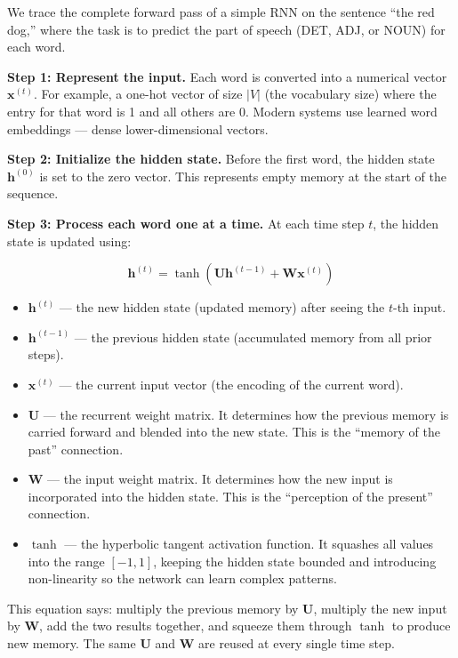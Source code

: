 \documentclass[12pt,a4paper]{article}
\begin{document}
We trace the complete forward pass of a simple RNN on the sentence ``the red dog,''
where the task is to predict the part of speech (DET, ADJ, or NOUN) for each word.

\medskip
\noindent\textbf{Step 1: Represent the input.}
Each word is converted into a numerical vector $\mathbf{x}^{(t)}$. For example, a
one-hot vector of size $|V|$ (the vocabulary size) where the entry for that word is 1
and all others are 0. Modern systems use learned word embeddings --- dense
lower-dimensional vectors.

\medskip
\noindent\textbf{Step 2: Initialize the hidden state.}
Before the first word, the hidden state $\mathbf{h}^{(0)}$ is set to the zero vector.
This represents empty memory at the start of the sequence.

\medskip
\noindent\textbf{Step 3: Process each word one at a time.}
At each time step $t$, the hidden state is updated using:

\[
\mathbf{h}^{(t)} = \tanh\!\left(\mathbf{U}\mathbf{h}^{(t-1)} + \mathbf{W}\mathbf{x}^{(t)}\right)
\]

\begin{itemize}
  \item $\mathbf{h}^{(t)}$ --- the new hidden state (updated memory) after seeing the
        $t$-th input.
  \item $\mathbf{h}^{(t-1)}$ --- the previous hidden state (accumulated memory from all
        prior steps).
  \item $\mathbf{x}^{(t)}$ --- the current input vector (the encoding of the current
        word).
  \item $\mathbf{U}$ --- the recurrent weight matrix. It determines how the previous
        memory is carried forward and blended into the new state. This is the
        ``memory of the past'' connection.
  \item $\mathbf{W}$ --- the input weight matrix. It determines how the new input is
        incorporated into the hidden state. This is the ``perception of the present''
        connection.
  \item $\tanh$ --- the hyperbolic tangent activation function. It squashes all values
        into the range $[-1, 1]$, keeping the hidden state bounded and introducing
        non-linearity so the network can learn complex patterns.
\end{itemize}

This equation says: multiply the previous memory by $\mathbf{U}$, multiply the new input
by $\mathbf{W}$, add the two results together, and squeeze them through $\tanh$ to
produce new memory. The same $\mathbf{U}$ and $\mathbf{W}$ are reused at every single
time step.
\end{document}
